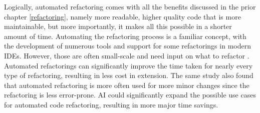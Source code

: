 Logically, automated refactoring comes with all the benefits discussed in the prior chapter \ref{refactoring}, namely more readable, higher quality code that is more maintainable, but more importantly, it makes all this possible in a shorter amount of time.
Automating the refactoring process is a familiar concept, with the development of numerous tools and support for some refactorings in modern IDEs. However, those are often small-scale and need input on what to refactor \cite{usedisuserefactor}.
Automated refactorings can significantly improve the time taken for nearly every type of refactoring, resulting in less cost in extension\cite{negara2013comparative}. The same study also found that automated refactoring is more often used for more minor changes since the refactoring is less error-prone. 
AI could significantly expand the possible use cases for automated code refactoring, resulting in more major time savings.